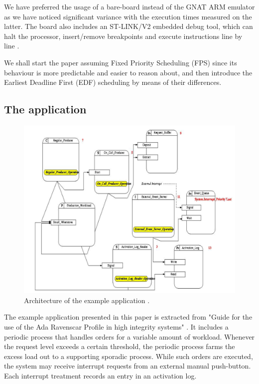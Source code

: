 \documentclass{article}
\begin{document}
We have preferred the usage of a bare-board instead of the GNAT ARM emulator as we have noticed significant variance with the execution times measured on the latter. The board also includes an ST-LINK/V2 embedded debug tool, which can halt the processor, insert/remove breakpoints and execute instructions line by line \cite{debug-trace}.

We shall start the paper assuming Fixed Priority Scheduling (FPS) since its behaviour is more predictable and easier to reason about, and then introduce the Earliest Deadline First (EDF) scheduling by means of their differences.

\subsection{The application}

\begin{figure}[!htbp]
\centering
\includegraphics[width=5in]{images/ycs}
\caption{Architecture of the example application \cite{ycs}.}
\label{ycs}
\end{figure}

The example application presented in this paper is extracted from "Guide for the use of the
Ada Ravenscar Profile in
high integrity systems" \cite{ycs}. It includes a periodic process that handles orders for a variable amount of workload. Whenever the request level exceeds a certain threshold, the periodic process farms the excess load out to a supporting sporadic process. While such orders are executed, the system may receive interrupt requests from an external manual push-button. Each interrupt treatment records an entry in an activation log.
\end{document}
